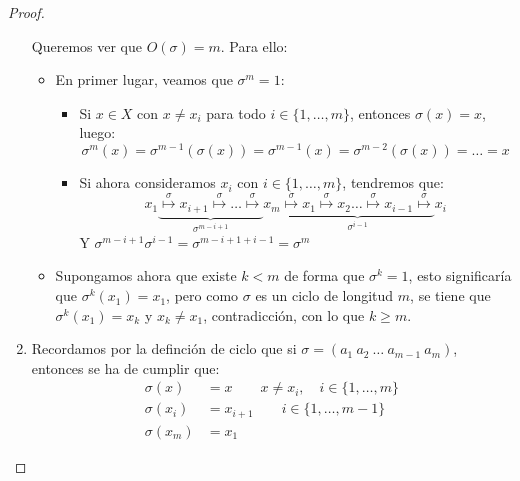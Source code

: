 \begin{prop}
\begin{proof}
\begin{enumerate}
                Queremos ver que $O(\sigma)=m$. Para ello:
                \begin{itemize}
                    \item En primer lugar, veamos que $\sigma^m = 1$:
                        \begin{itemize}
                            \item Si $x\in X$ con $x\neq x_i$ para todo $i \in \{1,\ldots,m\}$, entonces $\sigma(x)=x$, luego:
                                \begin{equation*}
                                    \sigma^m(x) = \sigma^{m-1}(\sigma(x)) = \sigma^{m-1}(x) = \sigma^{m-2}(\sigma(x)) =  \ldots = x
                                \end{equation*}
                            \item Si ahora consideramos $x_i$ con $i \in \{1,\ldots,m\}$, tendremos que:
                                \begin{equation*}
                                    x_1 \underbrace{\stackrel{\sigma}{\longmapsto} x_{i+1} \stackrel{\sigma}{\longmapsto} \ldots \stackrel{\sigma}{\longmapsto}}_{\sigma^{m-i+1}} x_m \underbrace{\stackrel{\sigma}{\longmapsto} x_1 \stackrel{\sigma}{\longmapsto} x_2 \ldots \stackrel{\sigma}{\longmapsto} x_{i-1} \stackrel{\sigma}{\longmapsto}}_{\sigma^{i-1}} x_i
                                \end{equation*}
                                Y $\sigma^{m-i+1}\sigma^{i-1} = \sigma^{m-i+1+i-1} = \sigma^m$
                        \end{itemize}
                    \item Supongamos ahora que existe $k<m$ de forma que $\sigma^k = 1$, esto significaría que $\sigma^k(x_1) = x_1$, pero como $\sigma$ es un ciclo de longitud $m$, se tiene que $\sigma^k(x_1) = x_k$ y $x_k \neq x_1$, contradicción, con lo que $k\geq m$.
                \end{itemize}
            \item Recordamos por la definción de ciclo que si $\sigma=(a_1\ a_2\ \ldots\ a_{m-1}\ a_m)$, entonces se ha de cumplir que:
                \begin{align*}
                    \sigma(x) &= x \qquad x\neq x_i, \quad i \in \{1,\ldots,m\} \\
                    \sigma(x_i) &= x_{i+1} \qquad i \in \{1,\ldots,m-1\} \\
                    \sigma(x_m) &= x_1
                \end{align*}

\end{enumerate}
\end{proof}
\end{prop}
